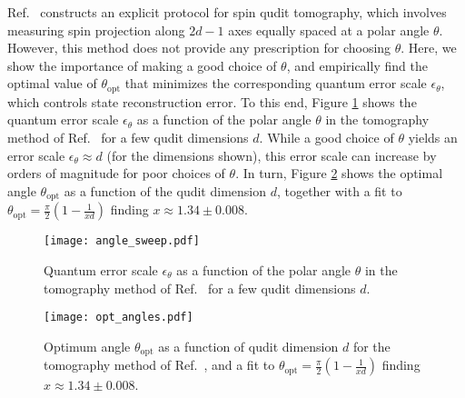 \documentclass[nofootinbib,twocolumn]{revtex4-1}
\renewcommand{\t}{\text} %
\begin{document}
Ref.~\cite{newton1968measurability} constructs an explicit protocol for spin qudit tomography, which involves measuring spin projection along $2d-1$ axes equally spaced at a polar angle $\theta$.
However, this method does not provide any prescription for choosing $\theta$.
Here, we show the importance of making a good choice of $\theta$, and empirically find the optimal value of $\theta_{\t{opt}}$ that minimizes the corresponding quantum error scale $\epsilon_\theta$, which controls state reconstruction error.
To this end, Figure \ref{fig:angle_sweep} shows the quantum error scale $\epsilon_\theta$ as a function of the polar angle $\theta$ in the tomography method of Ref.~\cite{newton1968measurability} for a few qudit dimensions $d$.
While a good choice of $\theta$ yields an error scale $\epsilon_\theta\approx d$ (for the dimensions shown), this error scale can increase by orders of magnitude for poor choices of $\theta$.
In turn, Figure \ref{fig:opt_angles} shows the optimal angle $\theta_{\t{opt}}$ as a function of the qudit dimension $d$, together with a fit to $\theta_{\t{opt}}=\frac{\pi}{2}(1-\frac1{xd})$ finding $x\approx1.34\pm0.008$.

\begin{figure}
  \centering
  \texttt{[image: angle\_sweep.pdf]}
  \caption{Quantum error scale $\epsilon_\theta$ as a function of the polar angle $\theta$ in the tomography method of Ref.~\cite{newton1968measurability} for a few qudit dimensions $d$.}
  \label{fig:angle_sweep}
\end{figure}

\begin{figure}
  \centering
  \texttt{[image: opt\_angles.pdf]}
  \caption{Optimum angle $\theta_{\t{opt}}$ as a function of qudit dimension $d$ for the tomography method of Ref.~\cite{newton1968measurability}, and a fit to $\theta_{\t{opt}}=\frac{\pi}{2}(1-\frac1{xd})$ finding $x\approx1.34\pm0.008$.}
  \label{fig:opt_angles}
\end{figure}
\end{document}
